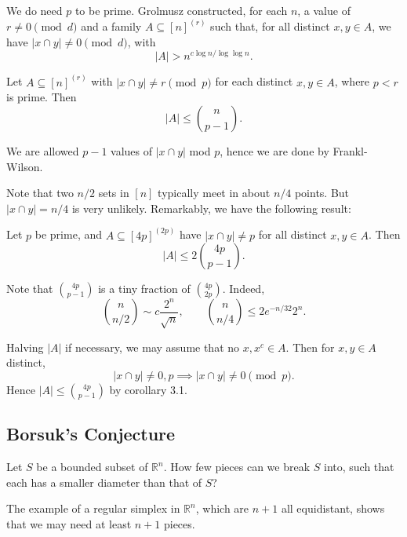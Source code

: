 \documentclass[12pt]{article}
\begin{document}

\begin{remark}
	We do need $p$ to be prime. Grolmusz constructed, for each $n$, a value of $r \neq 0 \pmod d$ and a family $A \subseteq [n]^{(r)}$ such that, for all distinct $x, y \in A$, we have $|x \cap y| \not = 0 \pmod d$, with
	\[
	|A| > n^{c \log n / \log \log n}.
	\]
\end{remark}

\begin{corollary}
	Let $A \subseteq [n]^{(r)}$ with $|x \cap y| \neq r \pmod p$ for each distinct $x, y \in A$, where $p < r$ is prime. Then
	\[
		|A| \leq \binom n{p-1}.
	\]
\end{corollary}

\begin{proofbox}
	We are allowed $p-1$ values of $|x \cap y|$ mod $p$, hence we are done by Frankl-Wilson.
\end{proofbox}

Note that two $n/2$ sets in $[n]$ typically meet in about $n/4$ points. But $|x \cap y| = n/4$ is very unlikely. Remarkably, we have the following result:

\begin{corollary}
	Let $p$ be prime, and $A \subseteq [4p]^{(2p)}$ have $|x \cap y|\neq p$ for all distinct $x, y \in A$. Then
	\[
		|A| \leq 2 \binom{4p}{p-1}.
	\]
\end{corollary}

Note that $\binom{4p}{p-1}$ is a tiny fraction of $\binom{4p}{2p}$. Indeed,
\[
	\binom{n}{n/2} \sim c \frac{2^{n}}{\sqrt n}, \qquad \binom{n}{n/4} \leq 2 e^{-n/32} 2^{n}.
\]

\begin{proofbox}
	Halving $|A|$ if necessary, we may assume that no $x, x^{c} \in A$. Then for $x, y \in A$ distinct,
	\[
	|x \cap y| \neq 0, p \implies |x \cap y| \neq 0 \pmod p.
	\]
	Hence $|A| \leq \binom{4p}{p-1}$ by corollary 3.1.
\end{proofbox}

\subsection{Borsuk's Conjecture}%
\label{sub:borsum}

Let $S$ be a bounded subset of $\mathbb{R}^n$. How few pieces can we break $S$ into, such that each has a smaller diameter than that of $S$?

The example of a regular simplex in $\mathbb{R}^n$, which are $n + 1$ all equidistant, shows that we may need at least $n + 1$ pieces.
\end{document}

